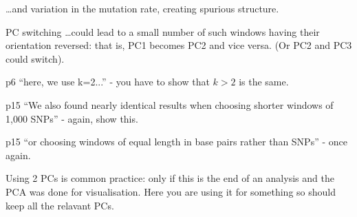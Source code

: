 
\begin{point}{}
\ldots and variation in the mutation rate, creating spurious structure.
\end{point}

\reply{

}

\begin{point}{PC switching}
\ldots could lead to a small number of such windows having their
orientation reversed: that is, PC1 becomes PC2 and vice versa. (Or PC2 and PC3
could switch).
\end{point}


\begin{point}{p6}
``here, we use k=2...''  - you have to show that $k>2$ is the same.
\end{point}

\begin{point}{p15}
``We also found nearly identical results when choosing shorter windows of 1,000 SNPs'' - again, show this.
\end{point}

\begin{point}{p15}
 ``or choosing windows of equal length in base pairs rather than SNPs'' - once again.
\end{point}

\begin{point}{}
Using 2 PCs is common practice: only if this is the end of an analysis and the
PCA was done for visualisation. Here you are using it for something so should
keep all the relavant PCs.
\end{point}


